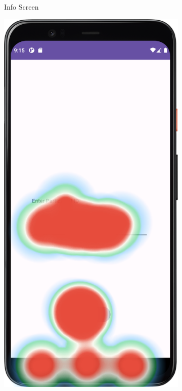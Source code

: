 \begin{figure}[htbp]
\begin{subfigure}[b]{0.25\textwidth}
        \caption{Info Screen}
        \label{subfig:heatmapA}
    \end{subfigure}
        \hspace{1cm}
    \begin{subfigure}[b]{0.25\textwidth}
        \centering
        \includegraphics[width=\textwidth]{content/07_evaluation_of_the_solution/HeatMap_ParticipantSelectionScreen.png}

\end{subfigure}
\end{figure}
